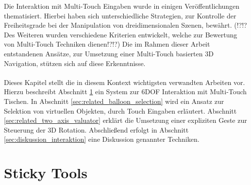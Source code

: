 Die Interaktion mit Multi-Touch Eingaben wurde in einigen Veröffentlichungen thematisiert. Hierbei haben sich unterschiedliche Strategien, zur Kontrolle der Freiheitsgrade bei der Manipulation von dreidimensionalen Szenen, bewährt. (!?!?Des Weiteren wurden verschiedene Kriterien entwickelt, welche zur Bewertung von Multi-Touch Techniken dienen!?!?) Die im Rahmen dieser Arbeit entstandenen Ansätze, zur Umsetzung einer Multi-Touch basierten 3D Navigation, stützen sich auf diese Erkenntnisse.
\\\\
Dieses Kapitel stellt die in diesem Kontext wichtigsten verwandten Arbeiten vor. Hierzu beschreibt Abschnitt \ref{sec:related_sticky_tools} ein System zur 6DOF Interaktion mit Multi-Touch Tischen. In Abschnitt \ref{sec:related_balloon_selection} wird ein Ansatz zur Selektion von virtuellen Objekten, durch Touch Eingaben erläutert. Abschnitt \ref{sec:related_two_axis_valuator} erklärt die Umsetzung einer expliziten Geste zur Steuerung der 3D Rotation. Abschließend erfolgt in Abschnitt \ref{sec:diskussion_interaktion} eine Diskussion genannter Techniken.


\section{Sticky Tools}
\label{sec:related_sticky_tools}

